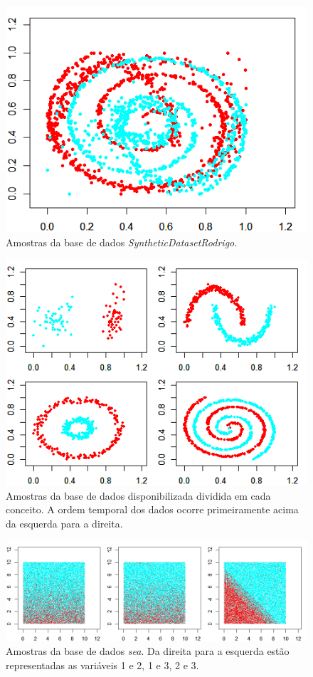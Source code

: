 \documentclass[conference]{IEEEtran}
\begin{document}
\begin{figure}[h]
\centerline{\includegraphics[width=0.55\columnwidth]{fig/rodrigo.png}}
\caption{Amostras da base de dados \textit{SyntheticDatasetRodrigo}.}
\label{rodrigo}
\end{figure}

\begin{figure}[h]
\centerline{\includegraphics[width=0.6\columnwidth]{fig/rodrigo_parts.png}}
\caption{Amostras da base de dados disponibilizada dividida em cada conceito. A ordem temporal dos dados ocorre primeiramente acima da esquerda para a direita.}
\label{rodrigo_parts}
\end{figure}

\begin{figure}[h]
\centerline{\includegraphics[width=1\columnwidth]{fig/sea.png}}
\caption{Amostras da base de dados \textit{sea}. Da direita para a esquerda estão representadas as variáveis 1 e 2, 1 e 3, 2 e 3.}
\label{sea}
\end{figure}
\end{document}
